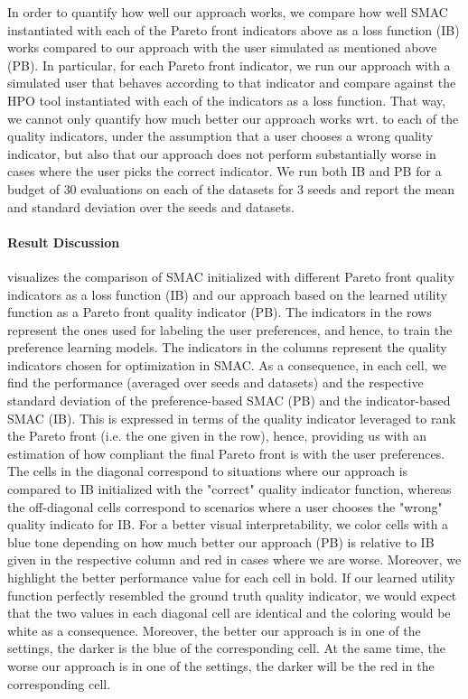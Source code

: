 In order to quantify how well our approach works, we compare how well SMAC instantiated with each of the Pareto front indicators above as a loss function (IB) works compared to our approach with the user simulated as mentioned above (PB). In particular, for each Pareto front indicator, we run our approach with a simulated user that behaves according to that indicator and compare against the HPO tool instantiated with each of the indicators as a loss function. That way, we cannot only quantify how much better our approach works wrt. to each of the quality indicators, under the assumption that a user chooses a wrong quality indicator, but also that our approach does not perform substantially worse in cases where the user picks the correct indicator. We run both IB and PB for a budget of $30$ evaluations on each of the datasets for $3$ seeds and report the mean and standard deviation over the seeds and datasets.

\paragraph{Result Discussion}
 visualizes the comparison of SMAC initialized with different Pareto front quality indicators as a loss function (IB) and our approach based on the learned utility function as a Pareto front quality indicator (PB).
The indicators in the rows represent the ones used for labeling the user preferences, and hence, to train the preference learning models.
The indicators in the columns represent the quality indicators chosen for optimization in SMAC.
As a consequence, in each cell, we find the performance (averaged over seeds and datasets) and the respective standard deviation of the preference-based SMAC (PB) and the indicator-based SMAC (IB).
This is expressed in terms of the quality indicator leveraged to rank the Pareto front (i.e. the one given in the row), hence, providing us with an estimation of how compliant the final Pareto front is with the user preferences.
The cells in the diagonal correspond to situations where our approach is compared to IB initialized with the "correct" quality indicator function, whereas the off-diagonal cells correspond to scenarios where a user chooses the "wrong" quality indicato for IB. For a better visual interpretability, we color cells with a blue tone depending on how much better our approach (PB) is relative to IB given in the respective column and red in cases where we are worse. Moreover, we highlight the better performance value for each cell in bold.
If our learned utility function perfectly resembled the ground truth quality indicator, we would expect that the two values in each diagonal cell are identical and the coloring would be white as a consequence. Moreover, the better our approach is in one of the settings, the darker is the blue of the corresponding cell. At the same time, the worse our approach is in one of the settings, the darker will be the red in the corresponding cell. 

